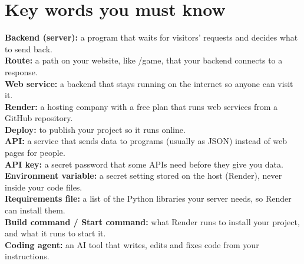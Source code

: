 \documentclass[11pt,a4paper]{article}
\begin{document}
\section{Key words you must know}
\textbf{Backend (server):} a program that waits for visitors' requests and decides what to send back.\\
\textbf{Route:} a path on your website, like /game, that your backend connects to a response.\\
\textbf{Web service:} a backend that stays running on the internet so anyone can visit it.\\
\textbf{Render:} a hosting company with a free plan that runs web services from a GitHub repository.\\
\textbf{Deploy:} to publish your project so it runs online.\\
\textbf{API:} a service that sends data to programs (usually as JSON) instead of web pages for people.\\
\textbf{API key:} a secret password that some APIs need before they give you data.\\
\textbf{Environment variable:} a secret setting stored on the host (Render), never inside your code files.\\
\textbf{Requirements file:} a list of the Python libraries your server needs, so Render can install them.\\
\textbf{Build command / Start command:} what Render runs to install your project, and what it runs to start it.\\
\textbf{Coding agent:} an AI tool that writes, edits and fixes code from your instructions.
\end{document}
